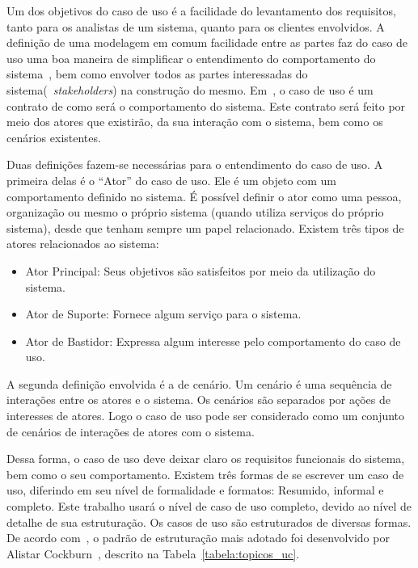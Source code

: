 Um dos objetivos do caso de uso é a facilidade do levantamento dos requisitos, tanto para os analistas de um sistema, quanto para os clientes envolvidos. A definição de uma modelagem em comum facilidade entre as partes faz do caso de uso uma boa maneira de simplificar o entendimento do comportamento do sistema~\cite{larman08}, bem como envolver todos as partes interessadas do sistema(~\emph{stakeholders}) na construção do mesmo. Em~\cite{cockburn01}, o caso de uso é um contrato de como será o comportamento do sistema. Este contrato será feito por meio dos atores que existirão, da sua interação com o sistema, bem como os cenários existentes.

Duas definições fazem-se necessárias para o entendimento do caso de uso. A primeira delas é o ``Ator'' do caso de uso. Ele é um objeto com um comportamento definido no sistema. É possível definir o ator como uma pessoa, organização ou mesmo o próprio sistema (quando utiliza serviços do próprio sistema), desde que tenham sempre um papel relacionado. Existem três tipos de atores relacionados ao sistema:
\begin{itemize}
	\item Ator Principal: Seus objetivos são satisfeitos por meio da utilização do sistema.
	\item Ator de Suporte: Fornece algum serviço para o sistema.
	\item Ator de Bastidor: Expressa algum interesse pelo comportamento do caso de uso.
\end{itemize}

A segunda definição envolvida é a de cenário. Um cenário é uma sequência de interações entre os atores e o sistema. Os cenários são separados por ações de interesses de atores. Logo o caso de uso pode ser considerado como um conjunto de cenários de interações de atores com o sistema.

Dessa forma, o caso de uso deve deixar claro os requisitos funcionais do sistema, bem como o seu comportamento. Existem três formas de se escrever um caso de uso, diferindo em seu nível de formalidade e formatos: Resumido, informal e completo. Este trabalho usará o nível de caso de uso completo, devido ao nível de detalhe de sua estruturação. Os casos de uso são estruturados de diversas formas. De acordo com~\cite{larman08}, o padrão de estruturação mais adotado foi desenvolvido por Alistar Cockburn~\cite{cockburn01}, descrito na Tabela~\ref{tabela:topicos_uc}.


